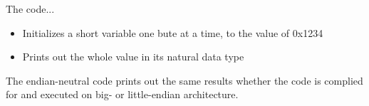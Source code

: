 \documentclass[letterpaper,10pt,onecolumn,compsoc]{IEEEtran}
\begin{document}
\noindent
The code...

\begin{itemize}
	\item Initializes a short variable one bute at a time, to the value of 0x1234
	\item Prints out the whole value in its natural data type
\end{itemize}

\noindent
The endian-neutral code prints out the same results whether the code is complied for and executed on big- or little-endian architecture.




\iffalse
\newpage

\begin{thebibliography}{1}

\bibitem{first}
F. Author. (year). 
\textit{title} 
. [Online]. Available: 
\\\url{url}

\end{thebibliography}

\bibitem{first}
F. Author. (year). 
\textit{title} 
. [Online]. Available: 
\\\url{url}
\fi
\end{document}
